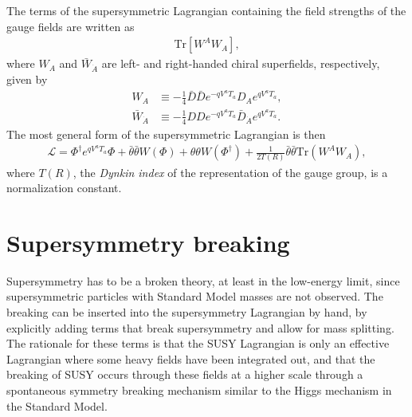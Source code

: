 \documentclass[twoside,english]{uiofysmaster}
\begin{document}
The terms of the supersymmetric Lagrangian containing the field strengths of the gauge fields are written as
\begin{align}
	\mathrm{Tr}[W^A W_A],
\end{align}
where $W_A$ and $\bar W_{\dot A}$ are left- and right-handed chiral superfields, respectively, given by
\begin{align}
	W_A &\equiv -\frac{1}{4}\bar D\bar D e^{-qV^aT_a} D_A e^{qV^a T_a},\\
	\bar W_{\dot A} &\equiv -\frac{1}{4} D D e^{-qV^aT_a} \bar D_{\dot A} e^{qV^a T_a}.
\end{align}
The most general form of the supersymmetric Lagrangian is then
\begin{align}
	\mathcal{L} = \Phi^\dag e^{qV^a T_a}\Phi + \bar\theta\bar\theta W(\Phi) + \theta\theta W(\Phi^\dag) + \frac{1}{2T(R)}\bar\theta\bar\theta \mathrm{Tr}(W^A W_A),
\end{align}
where $T(R)$, the {\it Dynkin index} of the representation of the gauge group, is a normalization constant.



\section{Supersymmetry breaking}
\label{sec:susybreaking}
Supersymmetry has to be a broken theory, at least in the low-energy limit, since supersymmetric particles with Standard Model masses are not observed. The breaking can be inserted into the supersymmetry Lagrangian by hand, by explicitly adding terms that break supersymmetry and allow for mass splitting. The rationale for these terms is that the SUSY Lagrangian is only an effective Lagrangian where some heavy fields have been integrated out, and that the breaking of SUSY occurs through these fields at a higher scale through a spontaneous symmetry breaking mechanism similar to the Higgs mechanism in the Standard Model. 
\end{document}
